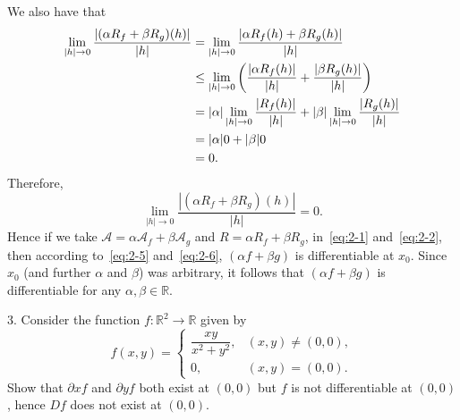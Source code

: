 \documentclass{article}
\newcommand{\A}{\mathcal{A}}
\newcommand{\0}{\mathbf{0}}
\newcommand{\R}{\mathbb{R}}
\begin{document}
We also have that
%
\begin{align*}
    \lim_{|h| \to 0} \frac{|(\alpha R_f + \beta R_g)(h)|}{|h|}
        &= \lim_{|h| \to 0} \frac{|\alpha R_f(h) + \beta R_g(h)|}{|h|} \\
        &\leq \lim_{|h| \to 0} \del{
            \frac{|\alpha R_f(h)|}{|h|} + \frac{|\beta R_g(h)|}{|h|}
        } \\
        &=
            |\alpha| \lim_{|h| \to 0} \frac{|R_f(h)|}{|h|}
            + |\beta| \lim_{|h| \to 0} \frac{|R_g(h)|}{|h|} \\
        &= |\alpha| 0 + |\beta| 0 \\
        &= 0.
\end{align*}
%
Therefore,
%
\begin{equation}
    \lim_{|h| \to 0} \frac{|(\alpha R_f + \beta R_g)(h)|}{|h|} = 0.
    \label{eq:2-6}
\end{equation}
%
Hence if we take $\A = \alpha \A_f + \beta \A_g$ and $R = \alpha R_f +
\beta R_g$, in~\eqref{eq:2-1} and~\eqref{eq:2-2}, then according
to~\eqref{eq:2-5} and~\eqref{eq:2-6}, $(\alpha f + \beta g)$ is
differentiable at $x_0$. Since $x_0$ (and further $\alpha$ and $\beta$)
was arbitrary, it follows that $(\alpha f + \beta g)$ is differentiable
for any $\alpha, \beta \in \R$.

\newpage

3. Consider the function $f: \R^2 \to \R$ given by
%
\begin{equation*}
    f(x, y)
    = \begin{cases}
        \dfrac{x y}{x^2 + y^2}, & (x, y) \neq (0, 0), \\
        0, & (x, y) = (0, 0).
   \end{cases}
\end{equation*}
%
Show that $\partial x f$ and $\partial y f$ both exist at $(0, 0)$ but
$f$ is not differentiable at $(0, 0)$, hence $D f$ does not exist at
$(0, 0)$.
\end{document}
